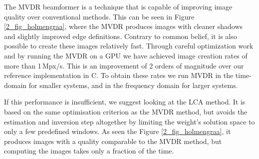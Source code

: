 {The MVDR beamformer is a technique that is capable of improving image quality over conventional methods. This can be seen in Figure \ref{2_fig_holmengraa}, where the MVDR produces images with cleaner shadows and slightly improved edge definitions. Contrary to common belief, it is also possible to create these images relatively fast. Through careful optimization work and by running the MVDR on a GPU we have achieved image creation rates of more than 1\,Mpx/s. This is an improvement of 2 orders of magnitude over our reference implementation in C. To obtain these rates we run MVDR in the time-domain for smaller systems, and in the frequency domain for larger systems.

If this performance is insufficient, we suggest looking at the LCA method. It is based on the same optimisation criterion as the MVDR method, but avoids the estimation and inversion step altogether by limiting the weight's solution space to only a few predefined windows. As seen the Figure \ref{2_fig_holmengraa}, it produces images with a quality comparable to the MVDR method, but computing the images takes only a fraction of the time.

}



